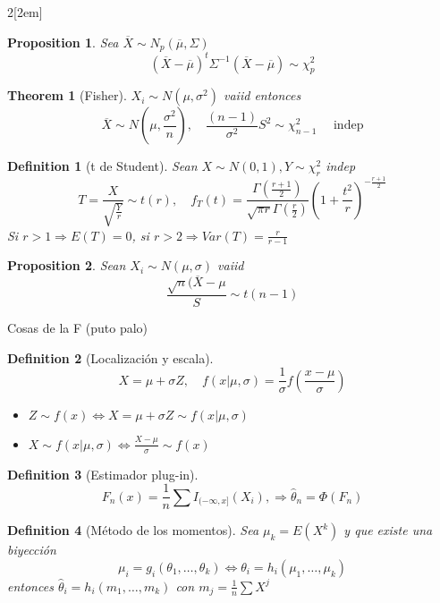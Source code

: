 \documentclass[leqno]{article}
\newtheorem*{theorem}{Theorem}
\newtheorem*{proposition}{Proposition}
\newtheorem*{definition}{Definition}
\begin{document}
\begin{multicols}{2}[\columnsep2em]
\begin{proposition}Sea $\overline{X}\sim N_p(\overline{\mu}, \Sigma)$ 
  \[
	(\overline{X}-\overline{\mu})^t\Sigma^{-1}(\overline{X}-\overline{\mu})\sim \chi^2_{p}
  \] 
\end{proposition}

\begin{theorem}[Fisher] $X_i \sim  N(\mu, \sigma ^2)$ vaiid entonces
\[
\overline{X} \sim N\left(\mu,\frac{\sigma ^2}{n}\right), \quad \frac{(n-1)}{\sigma ^2}S^2 \sim \chi _{n-1}^2 \quad \text{ indep}
\] 
\end{theorem}

\begin{definition}[t de Student] Sean $X \sim N(0,1), Y\sim \chi _r^2$ indep
\[
T = \frac{X}{\sqrt{\frac{Y}{r}}} \sim t(r), \quad f_T(t) = \frac{\Gamma (\frac{r+1}{2})}{\sqrt{\pi r}\Gamma \left( \frac{r}{2} \right)  } \left( 1+ \frac{t^2}{r} \right)^{-\frac{r+1}{2}}
\] 
Si  $r>1 \Rightarrow E(T)=0$, si $r>2  \Rightarrow Var(T) = \frac{r}{r-1}$
\end{definition}

\begin{proposition}Sean $X_i \sim N(\mu, \sigma )$ vaiid
  \[
  \frac{\sqrt{n} (\overline{X}-\mu}{S} \sim t(n-1)
  \] 
\end{proposition}

Cosas de la F (puto palo)

\begin{definition}[Localización y escala]
\[
  X = \mu + \sigma Z, \quad f(x|\mu, \sigma )= \frac{1}{\sigma }f\left( \frac{x-\mu}{\sigma } \right) 
\]
\begin{itemize}[topsep=-6pt, itemsep=0pt]
  \item $Z \sim f(x) \iff X = \mu + \sigma Z \sim f(x|\mu, \sigma )$
  \item $X\sim f(x|\mu, \sigma ) \iff \frac{X-\mu}{\sigma } \sim  f(x)$
\end{itemize}
\end{definition}

\begin{definition}[Estimador plug-in]
 \[
   F_n(x) = \frac{1}{n} \sum I_{(-\infty, x]}(X_i), \Rightarrow \hat{\theta }_n = \Phi (F_n)
\] 
\end{definition}

\begin{definition}[Método de los momentos]
Sea $\mu_k = E(X^k)$ y que existe una biyección
\[
\mu_i = g_i(\theta_1, \ldots, \theta _k) \iff \theta _i = h_i(\mu_1, \ldots, \mu _k)
\] 
entonces $\hat{\theta }_i = h_i(m_1,\ldots, m_k)$ con $m_j = \frac{1}{n}\sum X^j$
\end{definition}


\end{multicols}
\end{document}
